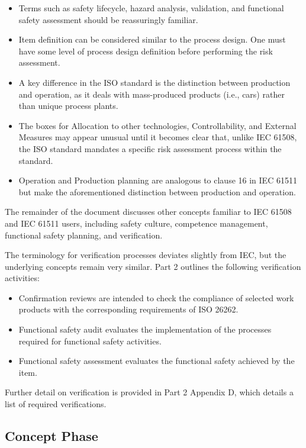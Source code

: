 \documentclass[./dissertation.tex]{subfiles}
\begin{document}
\begin{itemize}
\item Terms such as safety lifecycle, hazard analysis, validation, and functional safety assessment should be reassuringly familiar.
\item Item definition can be considered similar to the process design. One must have some level of process design definition before performing the risk assessment.
\item A key difference in the ISO standard is the distinction between production and operation, as it deals with mass-produced products (i.e., cars) rather than unique process plants.
\item The boxes for Allocation to other technologies, Controllability, and External Measures may appear unusual until it becomes clear that, unlike IEC 61508, the ISO standard mandates a specific risk assessment process within the standard.
\item Operation and Production planning are analogous to clause 16 in IEC 61511 but make the aforementioned distinction between production and operation.
\end{itemize}

The remainder of the document discusses other concepts familiar to IEC 61508 and IEC 61511 users, including safety culture, competence management, functional safety planning, and verification.

The terminology for verification processes deviates slightly from IEC, but the underlying concepts remain very similar. Part 2 outlines the following verification activities:

\begin{itemize}
\item Confirmation reviews are intended to check the compliance of selected work products with the corresponding requirements of ISO 26262.
\item Functional safety audit evaluates the implementation of the processes required for functional safety activities.
\item Functional safety assessment evaluates the functional safety achieved by the item.
\end{itemize}

Further detail on verification is provided in Part 2 Appendix D, which details a list of required verifications.




\subsection{Concept Phase}
\end{document}
